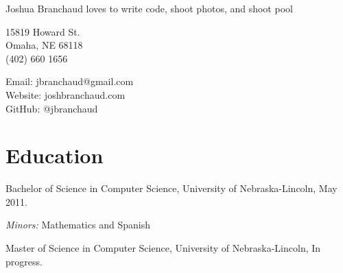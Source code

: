 \documentclass[10pt,letterpaper]{article}
\def\name{Joshua Branchaud}
\renewenvironment{itemize}{
  \begin{list}{}{
    \setlength{\leftmargin}{1.5em}
    \setlength{\itemsep}{0.25em}
    \setlength{\parskip}{0pt}
    \setlength{\parsep}{0.25em}
  }
}{
  \end{list}
}
\begin{document}
{\huge \name} \hfill {\color{Gray} {\large loves to write code, shoot photos, and shoot pool}}


\vspace{0.25in}

\begin{minipage}[t]{0.5\textwidth}
  15819 Howard St. \\
  Omaha, NE 68118 \\
  (402) 660 1656
\end{minipage}
\begin{minipage}[t]{0.5\textwidth}
  Email: jbranchaud@gmail.com \\
  Website: joshbranchaud.com \\
  GitHub: @jbranchaud
\end{minipage}


%

\section*{Education}

\begin{itemize}


  \item Bachelor of Science in Computer Science, University of Nebraska-Lincoln, May 2011.

    \begin{itemize}
        \item \textit{Minors:} Mathematics and Spanish
    \end{itemize}
    
    \item Master of Science in Computer Science, University of Nebraska-Lincoln, In
    progress.

\end{itemize}
\end{document}
